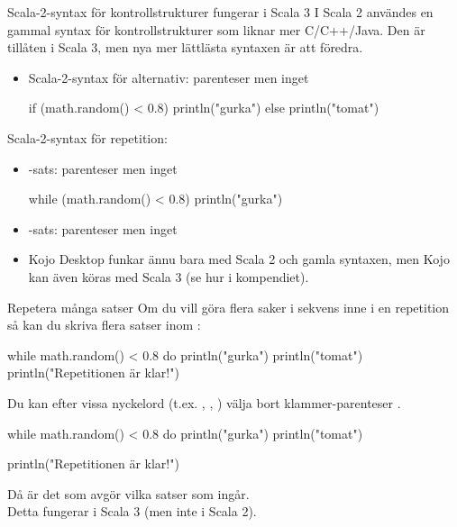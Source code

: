 \begin{Slide}{Scala-2-syntax för kontrollstrukturer fungerar i Scala 3}\SlideFontSmall
I Scala 2 användes en gammal syntax för kontrollstrukturer som liknar mer C/C++/Java. Den är tillåten i Scala 3, men nya mer lättlästa syntaxen är att föredra.
\begin{itemize}
\item Scala-2-syntax för alternativ: parenteser men inget 
\begin{Code}
if (math.random() < 0.8) println("gurka") else println("tomat")
\end{Code}
\end{itemize}

Scala-2-syntax för repetition:
\begin{itemize}
\item {}-sats: parenteser men inget 
\begin{Code}
while (math.random() < 0.8) println("gurka")
\end{Code}

\item {}-sats: parenteser men inget 

\item Kojo Desktop funkar ännu bara med Scala 2 och gamla syntaxen, men Kojo kan även köras med Scala 3 (se hur i kompendiet).

\end{itemize}

\end{Slide}

\begin{Slide}{Repetera många satser}
Om du vill göra flera saker i sekvens inne i en repetition så kan du skriva flera satser inom :
\begin{Code}
while math.random() < 0.8 do {
  println("gurka")
  println("tomat")
}
println("Repetitionen är klar!")
\end{Code}
\pause
Du kan efter vissa nyckelord (t.ex. , , ) välja bort klammer-parenteser . 
\begin{Code}
while math.random() < 0.8 do
  println("gurka")
  println("tomat")

println("Repetitionen är klar!")
\end{Code}
Då är det  som avgör vilka satser som ingår. \\Detta fungerar i Scala 3 (men inte i Scala 2).
\end{Slide}


